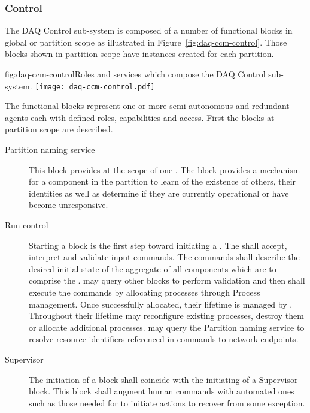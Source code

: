 \subsubsection{Control}
\label{sec:daq:design:ccm:control}

The DAQ Control sub-system is composed of a number of functional blocks in global or partition scope as illustrated in Figure~\ref{fig:daq-ccm-control}. 
Those blocks shown in partition scope have instances created for each partition. 


\begin{dunefigure}{fig:daq-ccm-control}{Roles and services which compose the DAQ Control sub-system.}
  \texttt{[image: daq-ccm-control.pdf]}
\end{dunefigure}

The functional blocks represent one or more semi-autonomous and redundant agents each with defined roles, capabilities and access.  First the blocks at partition scope are described.

\begin{description}
\item[Partition naming service] This block provides  at the scope of one . 
  The block provides a mechanism for a component in the partition to learn of the existence of others, their identities as well as determine if they are currently operational or have become unresponsive.

\item[Run control] Starting a  block is the first step toward initiating a . 
  The  shall accept, interpret and validate input commands.  The commands shall describe the desired initial state of the aggregate of all components which are to comprise the .   may query other blocks to perform validation and then shall execute the commands by allocating processes through Process management.  Once successfully allocated, their lifetime is managed by .  Throughout their lifetime  may reconfigure existing processes, destroy them or allocate additional processes.   may query the Partition naming service to resolve resource identifiers referenced in commands to network endpoints.  

\item[Supervisor] The initiation of a  block shall coincide with the initiating of a Supervisor block.  This block shall augment human commands with automated ones such as those needed for  to initiate actions to recover from some exception.

\end{description}

